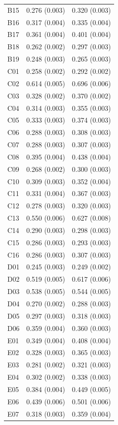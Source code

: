 \begin{longtable}[t]{lll}
B15 & 0.276 (0.003) & 0.320 (0.003)\\
B16 & 0.317 (0.004) & 0.335 (0.004)\\
B17 & 0.361 (0.004) & 0.401 (0.004)\\
B18 & 0.262 (0.002) & 0.297 (0.003)\\
B19 & 0.248 (0.003) & 0.265 (0.003)\\
C01 & 0.258 (0.002) & 0.292 (0.002)\\
C02 & 0.614 (0.005) & 0.696 (0.006)\\
C03 & 0.328 (0.002) & 0.370 (0.002)\\
C04 & 0.314 (0.003) & 0.355 (0.003)\\
C05 & 0.333 (0.003) & 0.374 (0.003)\\
C06 & 0.288 (0.003) & 0.308 (0.003)\\
C07 & 0.288 (0.003) & 0.307 (0.003)\\
C08 & 0.395 (0.004) & 0.438 (0.004)\\
C09 & 0.268 (0.002) & 0.300 (0.003)\\
C10 & 0.309 (0.003) & 0.352 (0.004)\\
C11 & 0.331 (0.004) & 0.367 (0.003)\\
C12 & 0.278 (0.003) & 0.320 (0.003)\\
C13 & 0.550 (0.006) & 0.627 (0.008)\\
C14 & 0.290 (0.003) & 0.298 (0.003)\\
C15 & 0.286 (0.003) & 0.293 (0.003)\\
C16 & 0.286 (0.003) & 0.307 (0.003)\\
D01 & 0.245 (0.003) & 0.249 (0.002)\\
D02 & 0.519 (0.005) & 0.617 (0.006)\\
D03 & 0.538 (0.005) & 0.544 (0.005)\\
D04 & 0.270 (0.002) & 0.288 (0.003)\\
D05 & 0.297 (0.003) & 0.318 (0.003)\\
D06 & 0.359 (0.004) & 0.360 (0.003)\\
E01 & 0.349 (0.004) & 0.408 (0.004)\\
E02 & 0.328 (0.003) & 0.365 (0.003)\\
E03 & 0.281 (0.002) & 0.321 (0.003)\\
E04 & 0.302 (0.002) & 0.338 (0.003)\\
E05 & 0.384 (0.004) & 0.449 (0.005)\\
E06 & 0.439 (0.006) & 0.501 (0.006)\\
E07 & 0.318 (0.003) & 0.359 (0.004)\\

\end{longtable}
